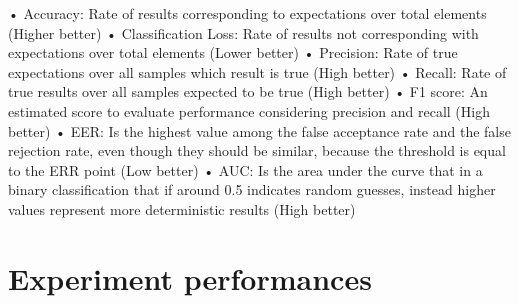 • Accuracy: Rate of results corresponding to expectations over total elements (Higher better)\newline
• Classification Loss: Rate of results not corresponding with expectations over total elements (Lower better)\newline
• Precision: Rate of true expectations over all samples which result is true (High better)\newline
• Recall: Rate of true results over all samples expected to be true (High better)\newline
• F1 score: An estimated score to evaluate performance considering precision and recall (High better)\newline
• EER: Is the highest value among the false acceptance rate and the false rejection rate, even though they should be similar, because the threshold is equal to the ERR point (Low better)\newline
• AUC: Is the area under the curve that in a binary classification that if around 0.5 indicates random guesses, instead higher values represent more deterministic results (High better)\newline
\section{Experiment performances}
\label{sec:experiment performance}
